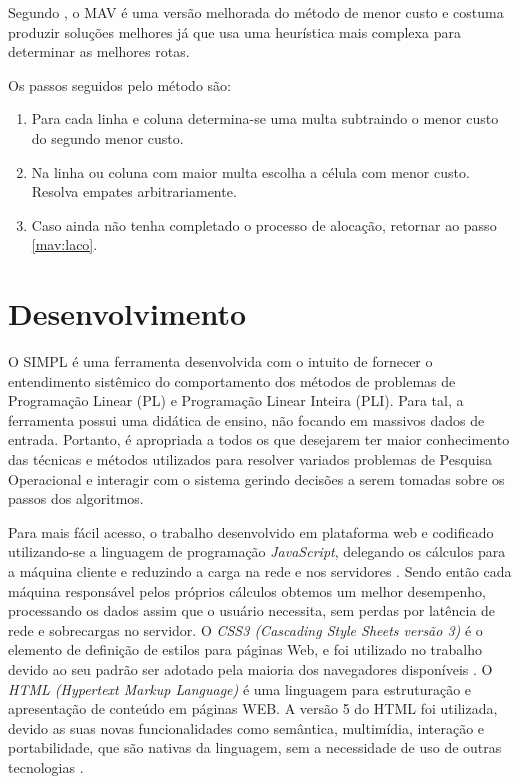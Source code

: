 \documentclass [11pt]{articleSBPO}
\begin{document}
Segundo \cite{taha}, o MAV é uma versão melhorada do método de menor custo e costuma produzir soluções melhores já que usa uma heurística mais complexa para determinar as melhores rotas.

Os passos seguidos pelo método são:

\begin{enumerate}
	\item Para cada linha e coluna determina-se uma multa subtraindo o menor custo do segundo menor custo. \label{mav:laco}
	\item Na linha ou coluna com maior multa escolha a célula com menor custo. Resolva empates arbitrariamente.
	\item Caso ainda não tenha completado o processo de alocação, retornar ao passo \ref{mav:laco}.
\end{enumerate}


\section{Desenvolvimento}\label{sec:desenvolvimento}

O SIMPL é uma ferramenta desenvolvida com o intuito de fornecer o entendimento sistêmico do comportamento dos métodos de problemas de Programação Linear (PL) e Programação Linear Inteira (PLI). Para tal, a ferramenta possui uma didática de ensino, não focando em massivos dados de entrada. Portanto, é apropriada a todos os que desejarem ter maior conhecimento das técnicas e métodos utilizados para resolver variados problemas de Pesquisa Operacional e interagir com o sistema gerindo decisões a serem tomadas sobre os passos dos algoritmos.

Para mais fácil acesso, o trabalho desenvolvido em plataforma web e codificado utilizando-se a linguagem de programação \textit{JavaScript}, delegando os cálculos para a máquina cliente e reduzindo a carga na rede e nos servidores \cite{livrojavascript1}. Sendo então cada máquina responsável pelos próprios cálculos obtemos um melhor desempenho, processando os dados assim que o usuário necessita, sem perdas por latência de rede e sobrecargas no servidor. O \textit{CSS3 (Cascading Style Sheets versão 3)} é o elemento de definição de estilos para páginas Web, e foi utilizado no trabalho devido ao seu padrão ser adotado pela maioria dos navegadores disponíveis \cite{livroweb2}. O \textit{HTML (Hypertext Markup Language)} é uma linguagem para estruturação e apresentação de conteúdo em páginas WEB. A versão 5 do HTML foi utilizada, devido as suas novas funcionalidades como semântica, multimídia, interação e portabilidade, que são nativas da linguagem, sem a necessidade de uso de outras tecnologias \cite{livroweb1}.
\end{document}
